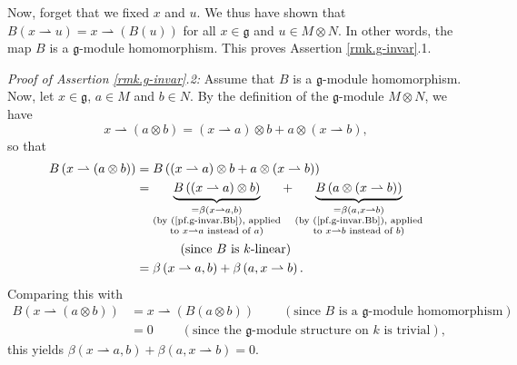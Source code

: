 \documentclass[etingof-lie.tex]{subfiles}
\begin{document}
\begin{verlong}
Now, forget that we fixed $x$ and $u$. We thus have shown that $B\left(
x\rightharpoonup u\right)  =x\rightharpoonup\left(  B\left(  u\right)
\right)  $ for all $x\in\mathfrak{g}$ and $u\in M\otimes N$. In other words,
the map $B$ is a $\mathfrak{g}$-module homomorphism. This proves Assertion
\ref{rmk.g-invar}.1.

\textit{Proof of Assertion \ref{rmk.g-invar}.2:} Assume that $B$ is a
$\mathfrak{g}$-module homomorphism. Now, let $x\in\mathfrak{g}$, $a\in M$ and
$b\in N$. By the definition of the $\mathfrak{g}$-module $M\otimes N$, we have%
\[
x\rightharpoonup\left(  a\otimes b\right)  =\left(  x\rightharpoonup a\right)
\otimes b+a\otimes\left(  x\rightharpoonup b\right)  ,
\]
so that%
\begin{align*}
B\left(  x\rightharpoonup\left(  a\otimes b\right)  \right)   &  =B\left(
\left(  x\rightharpoonup a\right)  \otimes b+a\otimes\left(  x\rightharpoonup
b\right)  \right) \\
&  =\underbrace{B\left(  \left(  x\rightharpoonup a\right)  \otimes b\right)
}_{\substack{=\beta\left(  x\rightharpoonup a,b\right)  \\\text{(by
(\ref{pf.g-invar.Bb}), applied}\\\text{to }x\rightharpoonup a\text{ instead of
}a\text{)}}}+\underbrace{B\left(  a\otimes\left(  x\rightharpoonup b\right)
\right)  }_{\substack{=\beta\left(  a,x\rightharpoonup b\right)  \\\text{(by
(\ref{pf.g-invar.Bb}), applied}\\\text{to }x\rightharpoonup b\text{ instead of
}b\text{)}}}\\
&  \ \ \ \ \ \ \ \ \ \ \left(  \text{since }B\text{ is }k\text{-linear}\right)
\\
&  =\beta\left(  x\rightharpoonup a,b\right)  +\beta\left(  a,x\rightharpoonup
b\right)  .
\end{align*}
Comparing this with%
\begin{align*}
B\left(  x\rightharpoonup\left(  a\otimes b\right)  \right)   &
=x\rightharpoonup\left(  B\left(  a\otimes b\right)  \right)
\ \ \ \ \ \ \ \ \ \ \left(  \text{since }B\text{ is a }\mathfrak{g}%
\text{-module homomorphism}\right) \\
&  =0\ \ \ \ \ \ \ \ \ \ \left(  \text{since the }\mathfrak{g}\text{-module
structure on }k\text{ is trivial}\right)  ,
\end{align*}
this yields $\beta\left(  x\rightharpoonup a,b\right)  +\beta\left(
a,x\rightharpoonup b\right)  =0$.


\end{verlong}
\end{document}
